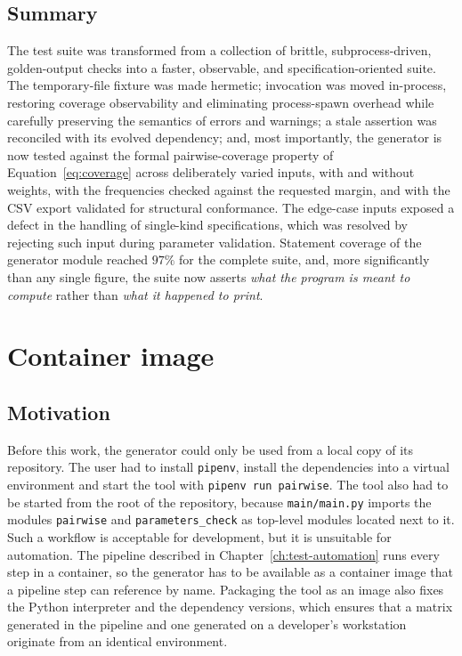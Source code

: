 \documentclass[
  digital, %
  oneside, %
  lof,     %
  nolot,     %
]{fithesis4}
\begin{document}
\subsection{Summary}
\label{sec:tsi-conclusion}

The test suite was transformed from a collection of brittle, subprocess-driven,
golden-output checks into a faster, observable, and specification-oriented suite.
The temporary-file fixture was made hermetic; invocation was moved in-process,
restoring coverage observability and eliminating process-spawn overhead while
carefully preserving the semantics of errors and warnings; a stale assertion was
reconciled with its evolved dependency; and, most importantly, the generator is
now tested against the formal pairwise-coverage property of
Equation~\eqref{eq:coverage} across deliberately varied inputs, with and without
weights, with the frequencies checked against the requested margin, and with the
\gls{CSV} export validated for structural conformance. The edge-case inputs exposed a
defect in the handling of single-kind specifications, which was resolved by
rejecting such input during parameter validation. Statement coverage of the generator module reached $97\%$ for
the complete suite, and, more
significantly than any
single figure, the suite now asserts \emph{what the program is meant to compute}
rather than \emph{what it happened to print}.

\section{Container image}
\label{sec:container-image}

\subsection{Motivation}
\label{sec:container-motivation}
Before this work, the generator could only be used from a local copy of its
repository. The user had to install \texttt{pipenv}, install the dependencies
into a virtual environment and start the tool with \texttt{pipenv run pairwise}.
The tool also had to be started from the root of the repository, because
\texttt{main/main.py} imports the modules \texttt{pairwise} and
\texttt{parameters\_check} as top-level modules located next to it. Such a
workflow is acceptable for development, but it is unsuitable for automation. The pipeline
described in Chapter~\ref{ch:test-automation} runs every step in a container, so
the generator has to be available as a container image that a pipeline step can
reference by name. Packaging the tool as an image also fixes the Python
interpreter and the dependency versions, which ensures that a matrix generated in the
pipeline and one generated on a developer's workstation originate from an
identical environment.
\end{document}
